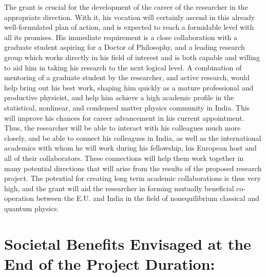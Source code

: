 \documentclass[a4paper,11pt,color]{article}
\begin{document}
\begin{enumerate}[label=(\alph*)]
The grant is crucial for the development of the career of the researcher in the appropriate direction. With it, his vocation will certainly ascend in this already well-formulated plan of action, and is expected to  reach a formidable level with all its promises. His immediate requirement is a close collaboration with a graduate student aspiring for a Doctor of Philosophy, and a leading research group which works directly in his field of interest and is both capable and willing to aid him in taking his research to the next logical level. A combination of mentoring of a graduate student by the researcher, and active research, would help bring out his best work, shaping him quickly as a mature professional and productive physicist, and help him achieve a high academic profile in the statistical, nonlinear, and condensed matter physics community in India. This will improve his chances for career advancement in his current appointment. Thus, the researcher will be able to interact with 
his colleagues much more closely, and be able to connect his colleagues in India, as well as the international academics with whom he will work during his fellowship, his European host and all of their collaborators. These connections will help them work together in many potential directions that will arise from the results of the proposed research project. The potential for creating long term academic collaborations is thus very high, and the grant will aid the researcher in forming mutually beneficial co-operation between the E.U. and India in the field of nonequilibrium classical and quantum physics.
\end{enumerate}

\section{Societal Benefits Envisaged at the End of the Project Duration:}
\end{document}
